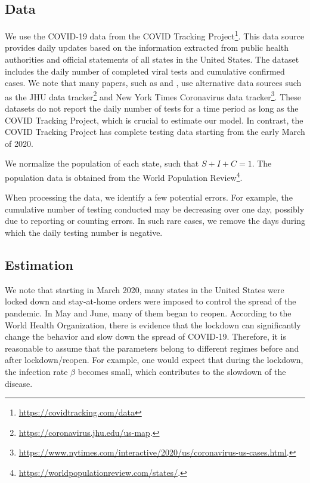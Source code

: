 \documentclass[nonblindrev, copyedit]{informs3a}
\begin{document}
\subsection{Data}
\label{Data}
We use the COVID-19 data from the COVID Tracking Project\footnote{\url{https://covidtracking.com/data}}.
This data source provides daily updates based on the information extracted from public health authorities and official statements of all states in the United States.
The dataset includes the daily number of completed viral tests and cumulative confirmed cases.
We note that many papers, such as \citet{toda2020susceptible} and \citet{birge2020controlling}, use alternative data sources such as the JHU data tracker\footnote{\url{https://coronavirus.jhu.edu/us-map}.} and New York Times Coronavirus data tracker\footnote{\url{https://www.nytimes.com/interactive/2020/us/coronavirus-us-cases.html}.}.
These datasets do not report the daily number of tests for a time period as long as the COVID Tracking Project, which is crucial to estimate our model.
In contrast, the COVID Tracking Project has complete testing data starting from the early March of 2020.

We normalize the population of each state, such that $S+I+C=1$.
The population data is obtained from the World Population Review\footnote{\url{https://worldpopulationreview.com/states/}.}.


When processing the data, we identify a few potential errors.
For example, the cumulative number of testing conducted may be decreasing over one day, possibly due to reporting or counting errors.
In such rare cases, we remove the days during which the daily testing number is negative.

\subsection{Estimation}
\label{Estimation}
We note that starting in March 2020, many states in the United States were locked down and stay-at-home orders were imposed to control the spread of the pandemic.
In May and June, many of them began to reopen.
According to the World Health Organization,
there is evidence that the lockdown can significantly change the behavior and slow down the spread of COVID-19.
Therefore, it is reasonable to assume that the parameters belong to different regimes before and after lockdown/reopen. For example, one would expect that
during the lockdown, the infection rate $\beta$ becomes small, which contributes to the slowdown of the disease.
\end{document}
